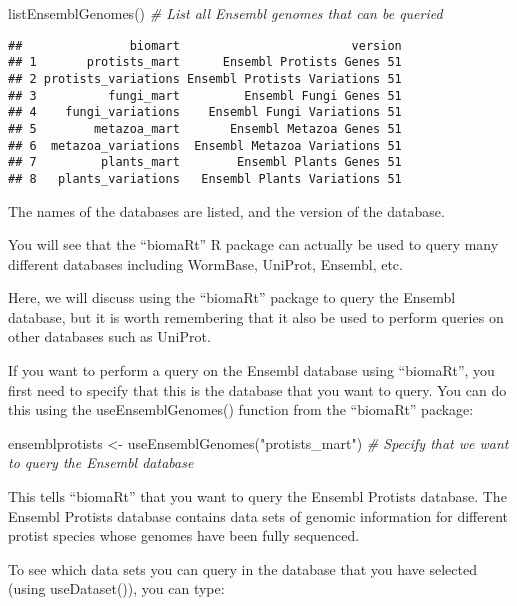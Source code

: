\documentclass[
]{book}
\newenvironment{Shaded}{\begin{snugshade}}{\end{snugshade}}
\newcommand{\CommentTok}[1]{\textcolor[rgb]{0.56,0.35,0.01}{\textit{#1}}}
\newcommand{\FunctionTok}[1]{\textcolor[rgb]{0.00,0.00,0.00}{#1}}
\newcommand{\NormalTok}[1]{#1}
\newcommand{\OtherTok}[1]{\textcolor[rgb]{0.56,0.35,0.01}{#1}}
\newcommand{\StringTok}[1]{\textcolor[rgb]{0.31,0.60,0.02}{#1}}
\begin{document}
\begin{Shaded}
\begin{Highlighting}[]
\FunctionTok{listEnsemblGenomes}\NormalTok{()        }\CommentTok{\# List all Ensembl genomes that can be queried}
\end{Highlighting}
\end{Shaded}

\begin{verbatim}
##               biomart                        version
## 1       protists_mart      Ensembl Protists Genes 51
## 2 protists_variations Ensembl Protists Variations 51
## 3          fungi_mart         Ensembl Fungi Genes 51
## 4    fungi_variations    Ensembl Fungi Variations 51
## 5        metazoa_mart       Ensembl Metazoa Genes 51
## 6  metazoa_variations  Ensembl Metazoa Variations 51
## 7         plants_mart        Ensembl Plants Genes 51
## 8   plants_variations   Ensembl Plants Variations 51
\end{verbatim}

The names of the databases are listed, and the version of the database.

You will see that the ``biomaRt'' R package can actually be used to query many different databases including WormBase, UniProt, Ensembl, etc.

Here, we will discuss using the ``biomaRt'' package to query the Ensembl database, but it is worth remembering that it also be used to perform queries on other databases such as UniProt.

If you want to perform a query on the Ensembl database using ``biomaRt'', you first need to specify that this is the database that you want to query. You can do this using the useEnsemblGenomes() function from the ``biomaRt'' package:

\begin{Shaded}
\begin{Highlighting}[]
\NormalTok{ensemblprotists }\OtherTok{\textless{}{-}} \FunctionTok{useEnsemblGenomes}\NormalTok{(}\StringTok{"protists\_mart"}\NormalTok{) }\CommentTok{\# Specify that we want to query the Ensembl database}
\end{Highlighting}
\end{Shaded}

This tells ``biomaRt'' that you want to query the Ensembl Protists database. The Ensembl Protists database contains data sets of genomic information for different protist species whose genomes have been fully sequenced.

To see which data sets you can query in the database that you have selected (using useDataset()), you can type:
\end{document}
